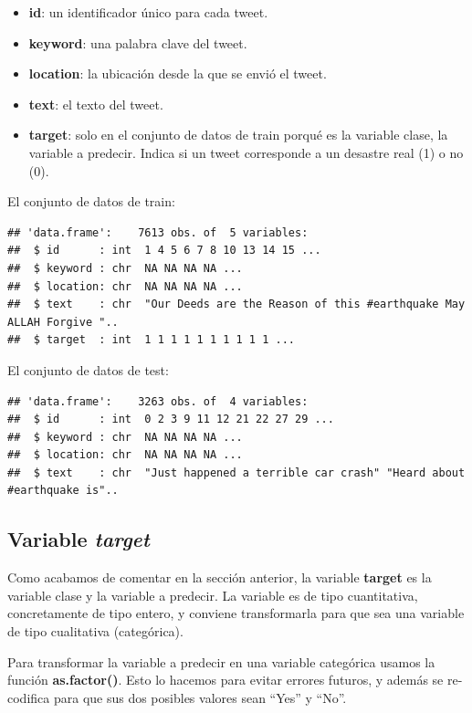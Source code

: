 \documentclass[]{article}
\providecommand{\tightlist}{%
  \setlength{\itemsep}{0pt}\setlength{\parskip}{0pt}}
\begin{document}
\begin{itemize}
\tightlist
\item
  \textbf{id}: un identificador único para cada tweet.
\item
  \textbf{keyword}: una palabra clave del tweet.
\item
  \textbf{location}: la ubicación desde la que se envió el tweet.
\item
  \textbf{text}: el texto del tweet.
\item
  \textbf{target}: solo en el conjunto de datos de train porqué es la
  variable clase, la variable a predecir. Indica si un tweet corresponde a un
  desastre real (1) o no (0).
\end{itemize}

El conjunto de datos de train:

\begin{verbatim}
## 'data.frame':    7613 obs. of  5 variables:
##  $ id      : int  1 4 5 6 7 8 10 13 14 15 ...
##  $ keyword : chr  NA NA NA NA ...
##  $ location: chr  NA NA NA NA ...
##  $ text    : chr  "Our Deeds are the Reason of this #earthquake May ALLAH Forgive "..
##  $ target  : int  1 1 1 1 1 1 1 1 1 1 ...
\end{verbatim}

El conjunto de datos de test:

\begin{verbatim}
## 'data.frame':    3263 obs. of  4 variables:
##  $ id      : int  0 2 3 9 11 12 21 22 27 29 ...
##  $ keyword : chr  NA NA NA NA ...
##  $ location: chr  NA NA NA NA ...
##  $ text    : chr  "Just happened a terrible car crash" "Heard about #earthquake is"..
\end{verbatim}

\hypertarget{variable-target}{%
\subsection{\texorpdfstring{Variable
\emph{target}}{Variable target}}\label{variable-target}}

Como acabamos de comentar en la sección anterior, la variable \textbf{target} es la variable clase y la variable a
predecir. La variable es de tipo cuantitativa, concretamente de tipo entero, y conviene
transformarla para que sea una variable de tipo cualitativa (categórica). 

Para transformar la variable a predecir en una variable categórica usamos la función \textbf{as.factor()}. Esto lo hacemos para evitar errores futuros, y además se re-codifica para que sus dos posibles valores sean ``Yes'' y ``No''.
\end{document}
